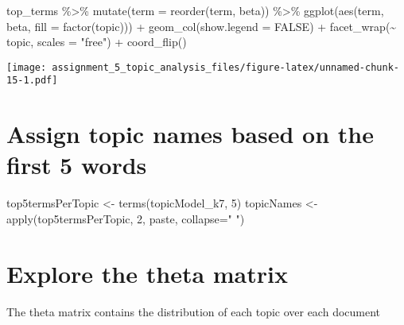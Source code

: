 \documentclass[
]{article}
\newenvironment{Shaded}{\begin{snugshade}}{\end{snugshade}}
\newcommand{\AttributeTok}[1]{\textcolor[rgb]{0.77,0.63,0.00}{#1}}
\newcommand{\ConstantTok}[1]{\textcolor[rgb]{0.00,0.00,0.00}{#1}}
\newcommand{\DecValTok}[1]{\textcolor[rgb]{0.00,0.00,0.81}{#1}}
\newcommand{\FunctionTok}[1]{\textcolor[rgb]{0.00,0.00,0.00}{#1}}
\newcommand{\NormalTok}[1]{#1}
\newcommand{\OtherTok}[1]{\textcolor[rgb]{0.56,0.35,0.01}{#1}}
\newcommand{\SpecialCharTok}[1]{\textcolor[rgb]{0.00,0.00,0.00}{#1}}
\newcommand{\StringTok}[1]{\textcolor[rgb]{0.31,0.60,0.02}{#1}}
\begin{document}
\begin{Shaded}
\begin{Highlighting}[]
\NormalTok{top\_terms }\SpecialCharTok{\%\textgreater{}\%}
  \FunctionTok{mutate}\NormalTok{(}\AttributeTok{term =} \FunctionTok{reorder}\NormalTok{(term, beta)) }\SpecialCharTok{\%\textgreater{}\%}
  \FunctionTok{ggplot}\NormalTok{(}\FunctionTok{aes}\NormalTok{(term, beta, }\AttributeTok{fill =} \FunctionTok{factor}\NormalTok{(topic))) }\SpecialCharTok{+}
  \FunctionTok{geom\_col}\NormalTok{(}\AttributeTok{show.legend =} \ConstantTok{FALSE}\NormalTok{) }\SpecialCharTok{+}
  \FunctionTok{facet\_wrap}\NormalTok{(}\SpecialCharTok{\textasciitilde{}}\NormalTok{ topic, }\AttributeTok{scales =} \StringTok{"free"}\NormalTok{) }\SpecialCharTok{+}
  \FunctionTok{coord\_flip}\NormalTok{()}
\end{Highlighting}
\end{Shaded}

\texttt{[image: assignment\_5\_topic\_analysis\_files/figure-latex/unnamed-chunk-15-1.pdf]}

\hypertarget{assign-topic-names-based-on-the-first-5-words}{%
\section{Assign topic names based on the first 5
words}\label{assign-topic-names-based-on-the-first-5-words}}

\begin{Shaded}
\begin{Highlighting}[]
\NormalTok{top5termsPerTopic }\OtherTok{\textless{}{-}} \FunctionTok{terms}\NormalTok{(topicModel\_k7, }\DecValTok{5}\NormalTok{)}
\NormalTok{topicNames }\OtherTok{\textless{}{-}} \FunctionTok{apply}\NormalTok{(top5termsPerTopic, }\DecValTok{2}\NormalTok{, paste, }\AttributeTok{collapse=}\StringTok{" "}\NormalTok{)}
\end{Highlighting}
\end{Shaded}

\hypertarget{explore-the-theta-matrix}{%
\section{Explore the theta matrix}\label{explore-the-theta-matrix}}

The theta matrix contains the distribution of each topic over each
document
\end{document}
